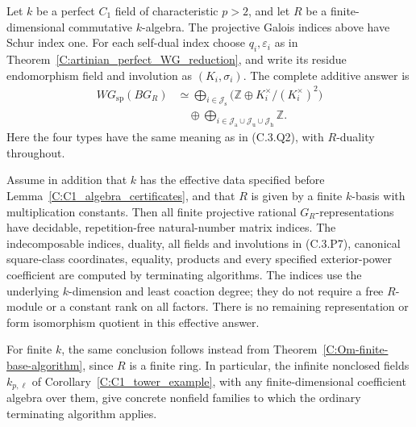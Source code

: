 \begin{theorem}
\label{C:artinian_effective_C1}
Let $k$ be a perfect $C_1$ field of characteristic $p>2$,
and let $R$ be a finite-dimensional commutative $k$-algebra.
The projective Galois indices above have Schur index one.
For each self-dual index choose $q_i,\varepsilon_i$ as in
Theorem~\ref{C:artinian_perfect_WG_reduction}, and write its
residue endomorphism field and involution as $(K_i,\sigma_i)$.
The complete additive answer is
\[
 \begin{split}
 WG_{\mathrm{sp}}(BG_R)
   &\simeq
    \bigoplus_{i\in\mathscr J_{\mathrm s}}
       \bigl(\mathbb Z\oplus K_i^\times/(K_i^\times)^2\bigr)\\
   &\quad\oplus
    \bigoplus_{i\in\mathscr J_{\mathrm a}\cup
                    \mathscr J_{\mathrm u}\cup
                    \mathscr J_{\mathrm h}}\mathbb Z .
 \end{split}                                               \tag{C.3.P7}
\]
Here the four types have the same meaning as in (C.3.Q2),
with $R$-duality throughout.

Assume in addition that $k$ has the effective data specified
before Lemma~\ref{C:C1_algebra_certificates}, and that $R$ is
given by a finite $k$-basis with multiplication constants.
Then all finite projective rational $G_R$-representations
have decidable, repetition-free natural-number matrix indices.
The indecomposable indices, duality, all fields and involutions
in (C.3.P7), canonical square-class coordinates, equality,
products and every specified exterior-power coefficient are
computed by terminating algorithms. The indices use the
underlying $k$-dimension and least coaction degree; they do
not require a free $R$-module or a constant rank on all factors.
There is no remaining representation or form isomorphism
quotient in this effective answer.

For finite $k$, the same conclusion follows instead from
Theorem~\ref{C:Om-finite-base-algorithm}, since $R$ is a finite
ring. In particular, the infinite nonclosed fields
$k_{p,\ell}$ of Corollary~\ref{C:C1_tower_example}, with any
finite-dimensional coefficient algebra over them, give
concrete nonfield families to which the ordinary terminating
algorithm applies.
\end{theorem}
